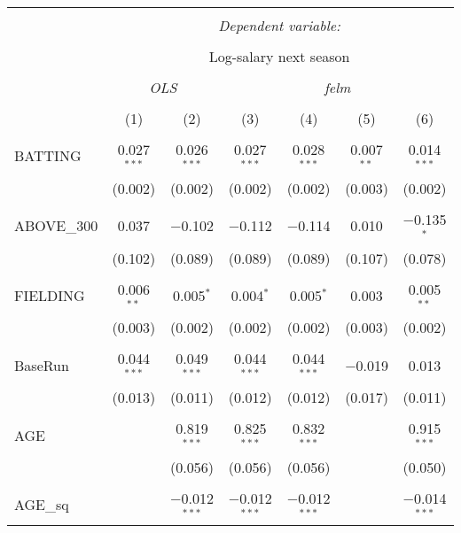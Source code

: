
\begin{table}[!htbp] \centering
  \caption{}
  \label{}
  \scriptsize
\begin{tabular}{@{\extracolsep{5pt}}lcccccc}
\\[-1.8ex]\hline
\hline \\[-1.8ex]
 & \multicolumn{6}{c}{\textit{Dependent variable:}} \\
\cline{2-7}
\\[-1.8ex] & \multicolumn{6}{c}{Log-salary next season} \\
\\[-1.8ex] & \multicolumn{2}{c}{\textit{OLS}} & \multicolumn{4}{c}{\textit{felm}} \\
\\[-1.8ex] & (1) & (2) & (3) & (4) & (5) & (6)\\
\hline \\[-1.8ex]
 BATTING & 0.027$^{***}$ & 0.026$^{***}$ & 0.027$^{***}$ & 0.028$^{***}$ & 0.007$^{**}$ & 0.014$^{***}$ \\
  & (0.002) & (0.002) & (0.002) & (0.002) & (0.003) & (0.002) \\
  & & & & & & \\
 ABOVE\_300 & 0.037 & $-$0.102 & $-$0.112 & $-$0.114 & 0.010 & $-$0.135$^{*}$ \\
  & (0.102) & (0.089) & (0.089) & (0.089) & (0.107) & (0.078) \\
  & & & & & & \\
 FIELDING & 0.006$^{**}$ & 0.005$^{*}$ & 0.004$^{*}$ & 0.005$^{*}$ & 0.003 & 0.005$^{**}$ \\
  & (0.003) & (0.002) & (0.002) & (0.002) & (0.003) & (0.002) \\
  & & & & & & \\
 BaseRun & 0.044$^{***}$ & 0.049$^{***}$ & 0.044$^{***}$ & 0.044$^{***}$ & $-$0.019 & 0.013 \\
  & (0.013) & (0.011) & (0.012) & (0.012) & (0.017) & (0.011) \\
  & & & & & & \\
 AGE &  & 0.819$^{***}$ & 0.825$^{***}$ & 0.832$^{***}$ &  & 0.915$^{***}$ \\
  &  & (0.056) & (0.056) & (0.056) &  & (0.050) \\
  & & & & & & \\
 AGE\_sq &  & $-$0.012$^{***}$ & $-$0.012$^{***}$ & $-$0.012$^{***}$ &  & $-$0.014$^{***}$ \\

\end{tabular}
\end{table}
